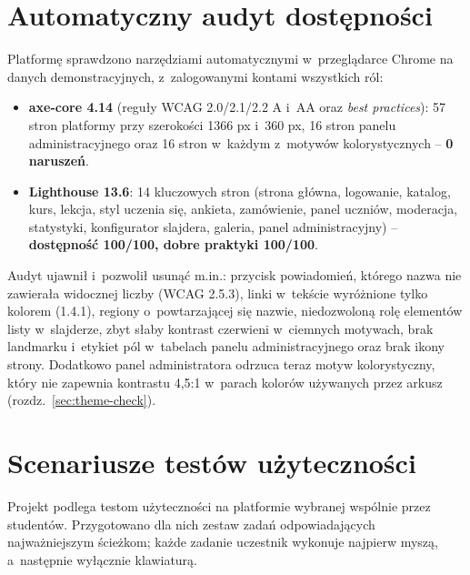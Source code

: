 \section{Automatyczny audyt dostępności}

Platformę sprawdzono narzędziami automatycznymi w~przeglądarce Chrome na danych demonstracyjnych,
z~zalogowanymi kontami wszystkich ról:

\begin{itemize}
  \item \textbf{axe-core 4.14} (reguły WCAG 2.0/2.1/2.2 A i~AA oraz \emph{best practices}):
        57 stron platformy przy szerokości 1366 px i~360 px, 16 stron panelu administracyjnego
        oraz 16 stron w~każdym z~motywów kolorystycznych -- \textbf{0 naruszeń}.
  \item \textbf{Lighthouse 13.6}: 14 kluczowych stron (strona główna, logowanie, katalog, kurs,
        lekcja, styl uczenia się, ankieta, zamówienie, panel uczniów, moderacja, statystyki,
        konfigurator slajdera, galeria, panel administracyjny) -- \textbf{dostępność 100/100,
        dobre praktyki 100/100}.
\end{itemize}

Audyt ujawnił i~pozwolił usunąć m.in.: przycisk powiadomień, którego nazwa nie zawierała widocznej
liczby (WCAG 2.5.3), linki w~tekście wyróżnione tylko kolorem (1.4.1), regiony o~powtarzającej się
nazwie, niedozwoloną rolę elementów listy w~slajderze, zbyt słaby kontrast czerwieni w~ciemnych
motywach, brak landmarku  i~etykiet pól w~tabelach panelu administracyjnego oraz brak
ikony strony. Dodatkowo panel administratora odrzuca teraz motyw kolorystyczny, który nie zapewnia
kontrastu 4,5:1 w~parach kolorów używanych przez arkusz (rozdz.~\ref{sec:theme-check}).

\section{Scenariusze testów użyteczności}

Projekt podlega testom użyteczności na platformie wybranej wspólnie przez studentów.
Przygotowano dla nich zestaw zadań odpowiadających najważniejszym ścieżkom; każde zadanie
uczestnik wykonuje najpierw myszą, a~następnie wyłącznie klawiaturą.

